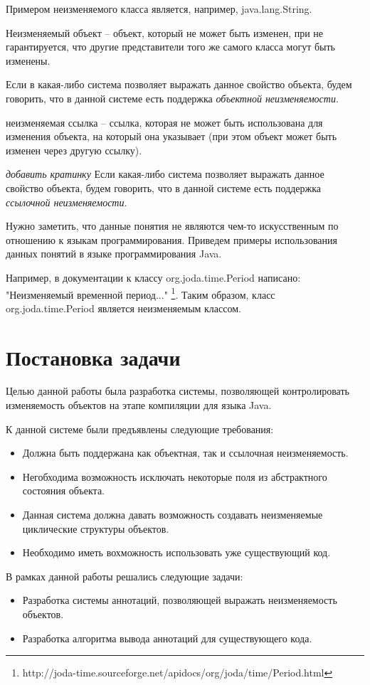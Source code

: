 Примером неизменяемого класса является, например, java.lang.String.

\begin{Def}\label{immutable_object}
Неизменяемый объект -- объект, который не может быть изменен, при не гарантируется, что другие представители того же самого класса могут быть изменены.
\end{Def}
Если в какая-либо система позволяет выражать данное свойство объекта, будем говорить, что в данной системе есть поддержка \textit{объектной неизменяемости}.

\begin{Def}\label{reference_immutability}
неизменяемая ссылка -- ссылка, которая не может быть использована для изменения объекта, на который она указывает (при этом объект может быть изменен через другую ссылку).
\end{Def} 

\textit{добавить кратинку}
Если какая-либо система позволяет выражать данное свойство объекта, будем говорить, что в данной системе есть поддержка \textit{ссылочной неизменяемости}. 

Нужно заметить, что данные понятия не являются чем-то искусственным по отношению к языкам программирования. Приведем примеры использования данных понятий в языке программирования Java.

Например, в документации к классу org.joda.time.Period написано: "Неизменяемый временной период..." \footnote{http://joda-time.sourceforge.net/apidocs/org/joda/time/Period.html}. Таким образом, класс org.joda.time.Period является неизменяемым классом. 



\section{Постановка задачи}

Целью данной работы была разработка системы, позволяющей контролировать изменяемость объектов на этапе компиляции для языка Java. 

К данной системе были предъявлены следующие требования:

\begin{itemize}
	\item Должна быть поддержана как объектная, так и ссылочная неизменяемость.
	
	\item Негобходима возможность исключать некоторые поля из абстрактного состояния объекта. 
	
	\item Данная система должна давать возможность создавать неизменяемые циклические структуры объектов.
	
	\item Необходимо иметь вохможность использовать уже существующий код.
\end{itemize}

В рамках данной работы решались следующие задачи:

\begin{itemize}

	\item Разработка системы аннотаций, позволяющей выражать неизменяемость объектов.
	
	\item Разработка алгоритма вывода аннотаций для существующего кода.

\end{itemize}



